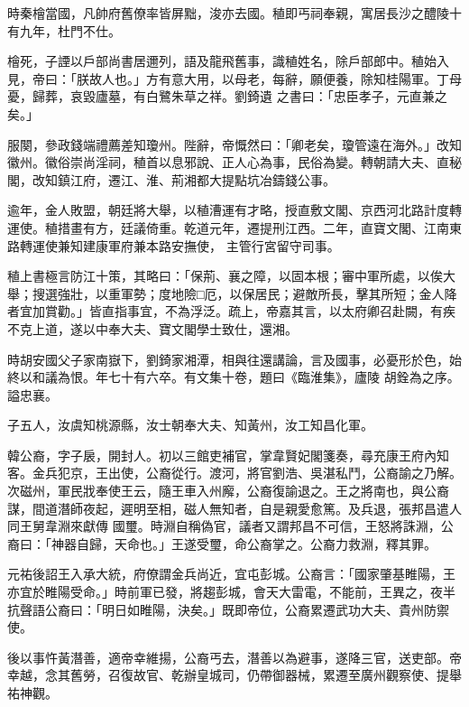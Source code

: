 \begin{pinyinscope}
 時秦檜當國，凡帥府舊僚率皆屏黜，浚亦去國。稙即丐祠奉親，寓居長沙之醴陵十有九年，杜門不仕。



 檜死，子諲以戶部尚書居邇列，語及龍飛舊事，識稙姓名，除戶部郎中。稙始入見，帝曰：「朕故人也。」方有意大用，以母老，每辭，願便養，除知桂陽軍。丁母憂，歸葬，哀毀廬墓，有白鷺朱草之祥。劉錡遺
 之書曰：「忠臣孝子，元直兼之矣。」



 服闋，參政錢端禮薦差知瓊州。陛辭，帝慨然曰：「卿老矣，瓊管遠在海外。」改知徽州。徽俗崇尚淫祠，稙首以息邪說、正人心為事，民俗為變。轉朝請大夫、直秘閣，改知鎮江府，遷江、淮、荊湘都大提點坑冶鑄錢公事。



 逾年，金人敗盟，朝廷將大舉，以稙漕運有才略，授直敷文閣、京西河北路計度轉運使。稙措畫有方，廷議倚重。乾道元年，遷提刑江西。二年，直寶文閣、江南東路轉運使兼知建康軍府兼本路安撫使，
 主管行宮留守司事。



 稙上書極言防江十策，其略曰：「保荊、襄之障，以固本根；審中軍所處，以俟大舉；搜選強壯，以重軍勢；度地險□厄，以保居民；避敵所長，擊其所短；金人降者宜加賞勸。」皆直指事宜，不為浮泛。疏上，帝嘉其言，以太府卿召赴闕，有疾不克上道，遂以中奉大夫、寶文閣學士致仕，還湘。



 時胡安國父子家南嶽下，劉錡家湘潭，相與往還講論，言及國事，必憂形於色，始終以和議為恨。年七十有六卒。有文集十卷，題曰《臨淮集》，廬陵
 胡銓為之序。謚忠襄。



 子五人，汝虞知桃源縣，汝士朝奉大夫、知黃州，汝工知昌化軍。



 韓公裔，字子扆，開封人。初以三館吏補官，掌韋賢妃閣箋奏，尋充康王府內知客。金兵犯京，王出使，公裔從行。渡河，將官劉浩、吳湛私鬥，公裔諭之乃解。次磁州，軍民戕奉使王云，隨王車入州廨，公裔復諭退之。王之將南也，與公裔謀，間道潛師夜起，遲明至相，磁人無知者，自是親愛愈篤。及兵退，張邦昌遣人同王舅韋淵來獻傳
 國璽。時淵自稱偽官，議者又謂邦昌不可信，王怒將誅淵，公裔曰：「神器自歸，天命也。」王遂受璽，命公裔掌之。公裔力救淵，釋其罪。



 元祐後詔王入承大統，府僚謂金兵尚近，宜屯彭城。公裔言：「國家肇基睢陽，王亦宜於睢陽受命。」時前軍已發，將趨彭城，會天大雷電，不能前，王異之，夜半抗聲語公裔曰：「明日如睢陽，決矣。」既即帝位，公裔累遷武功大夫、貴州防禦使。



 後以事忤黃潛善，適帝幸維揚，公裔丐去，潛善以為避事，遂降三官，送吏部。帝
 幸越，念其舊勞，召復故官、乾辦皇城司，仍帶御器械，累遷至廣州觀察使、提舉祐神觀。




\end{pinyinscope}
